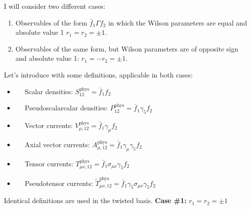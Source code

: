 \documentclass[english, LaM, oneside, noexaminfo]{sapthesis}
\begin{document}
I will consider two different cases:
\begin{enumerate}
    \item Observables of the form $\bar f_1 \Gamma f_2$ in which the Wilson parameters are equal and absolute value 1 $r_1 = r_2 = \pm 1$.
    \item Observables of the same form, but Wilson parameters are of opposite sign and absolute value 1: $r_1 = -r_2 = \pm 1$.
\end{enumerate}
Let's introduce with some definitions, applicable in both cases:
\begin{itemize}
    \item [] $\quad$ Scalar densities: \hspace*{5mm} $S_{12}^\text{phys} = \bar f_1 f_2$
    \item [] $\quad$ Pseudoscalarcalar densities: \hspace*{5mm} $P^{\text{phys}}_{12} = \bar f_1 \gamma_5 f_2$
    \item [] $\quad$ Vector currents: \hspace*{5mm} $V_{\mu,12}^{\text{phys}} = \bar f_1 \gamma_\mu f_2$
    \item [] $\quad$ Axial vector currents: \hspace*{5mm} $A_{\mu,12}^{\text{phys}} = \bar f_1 \gamma_\mu \gamma_5 f_2$
    \item [] $\quad$ Tensor currents: \hspace*{5mm} $T_{\mu\nu,12}^{\text{phys}} = \bar f_1 \sigma_{\mu\nu} \gamma_5 f_2$
    \item [] $\quad$ Pseudotensor currents: \hspace*{5mm} $\tilde{T}_{\mu\nu,12}^{\text{phys}} = \bar f_1 \gamma_5\sigma_{\mu\nu} \gamma_5 f_2$
\end{itemize}
Identical definitions are used in the twisted basis.
\newline
\newline
{\bf Case \#1: } $r_1 = r_2 = \pm 1$
\end{document}
